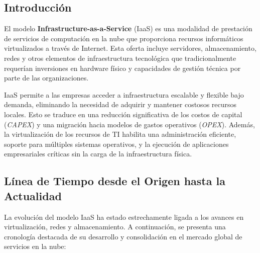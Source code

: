 {        \subsection{Introducción}
            El modelo \textbf{Infrastructure-as-a-Service} (IaaS) es una modalidad de prestación de servicios de computación en la nube que proporciona recursos informáticos virtualizados a través de Internet. Esta oferta incluye servidores, almacenamiento, redes y otros elementos de infraestructura tecnológica que tradicionalmente requerían inversiones en hardware físico y capacidades de gestión técnica por parte de las organizaciones.
            
            IaaS permite a las empresas acceder a infraestructura escalable y flexible bajo demanda, eliminando la necesidad de adquirir y mantener costosos recursos locales. Esto se traduce en una reducción significativa de los costos de capital (\textit{CAPEX}) y una migración hacia modelos de gastos operativos (\textit{OPEX}). Además, la virtualización de los recursos de TI habilita una administración eficiente, soporte para múltiples sistemas operativos, y la ejecución de aplicaciones empresariales críticas sin la carga de la infraestructura física.
            
        \subsection{Línea de Tiempo desde el Origen hasta la Actualidad}
            La evolución del modelo IaaS ha estado estrechamente ligada a los avances en virtualización, redes y almacenamiento. A continuación, se presenta una cronología destacada de su desarrollo y consolidación en el mercado global de servicios en la nube:
            
}
